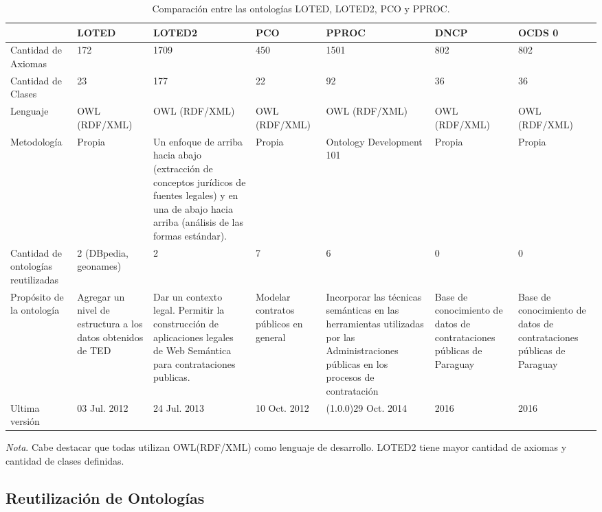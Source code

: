 \begin{table}[!htb]
    \caption{Comparación entre las ontologías LOTED, LOTED2, PCO y PPROC.}
    \label{tab:comparacion_ontologias}
    
    \scriptsize 
    \begin{tabular}{|L{2cm}|C{2.5cm}|C{2.5cm}|C{2cm}|C{2.5cm}|C{2cm}|C{2cm}|}
    \hline
     & LOTED & LOTED2 & PCO & PPROC & DNCP  & OCDS 0 \\
    \hline

    
    Cantidad de Axiomas & 172 & 1709 & 450 & 1501 & 802 & 802\\
    \hline

    Cantidad de Clases & 23 & 177 & 22 & 92 & 36 & 36\\
    \hline

    Lenguaje & OWL (RDF/XML) & OWL (RDF/XML) & OWL (RDF/XML) & OWL (RDF/XML) & OWL (RDF/XML)& OWL (RDF/XML)\\
    \hline
    Metodología & Propia & 
    Un enfoque de arriba hacia abajo (extracción de conceptos jurídicos de fuentes legales) y en una de abajo hacia arriba (análisis de las formas estándar).
     & Propia & Ontology Development 101 & Propia & Propia\\
     \hline
    Cantidad de ontologías reutilizadas & 2 (DBpedia, geonames) & 2 & 7 & 6 & 0  & 0\\
    \hline
    Propósito de la ontología & Agregar un nivel de estructura a los datos obtenidos de TED & Dar un contexto legal. Permitir la construcción de aplicaciones legales de Web Semántica para contrataciones publicas. & Modelar contratos públicos en general & Incorporar las técnicas
    semánticas en las herramientas utilizadas por las Administraciones públicas en los procesos de contratación & Base de conocimiento de datos de contrataciones públicas de Paraguay & Base de conocimiento de datos de contrataciones públicas de Paraguay \\
    \hline
    Ultima versión & 03 Jul. 2012 & 24 Jul. 2013 & 10 Oct. 2012 & (1.0.0)29 Oct. 2014 & 2016 & 2016\\
    \hline
    \end{tabular}
    
    \bigskip
    \small\textit{Nota}. Cabe destacar que todas utilizan OWL(RDF/XML) como lenguaje de desarrollo. LOTED2 tiene mayor cantidad de axiomas y cantidad de clases definidas.
    \end{table}

    \subsection{Reutilización de Ontologías}


